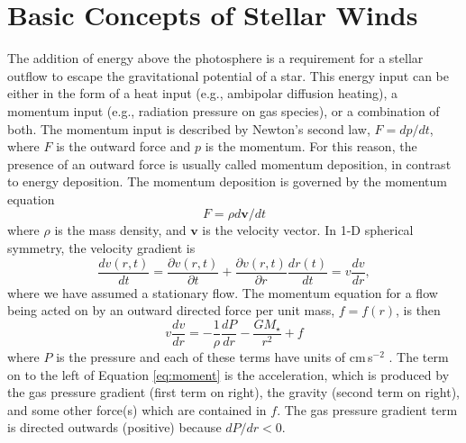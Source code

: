\section{Basic Concepts of Stellar Winds}\label{sec:1.3}
The addition of energy above the photosphere is a requirement for a stellar outflow to escape the gravitational potential of a star. This energy input can be either in the form of a heat input (e.g., ambipolar diffusion heating),  a momentum input (e.g., radiation pressure on gas species), or a combination of both. The momentum input is described by Newton's second law, $F=dp/dt$, where $F$ is the outward force and $p$ is the momentum. For this reason, the presence of an outward force is usually called momentum deposition, in contrast to energy deposition. The momentum deposition is governed by the momentum equation
\begin{equation}
F=\rho d\pmb{v}/dt
\end{equation}
where $\rho$ is the mass density, and $\pmb{v}$ is the velocity vector. In 1-D spherical symmetry, the velocity gradient is
\begin{equation}
\dfrac{dv(r,t)}{dt}=\dfrac{\partial v(r,t)}{\partial t}+\dfrac{\partial v(r,t)}{\partial r}\dfrac{dr(t)}{dt}=v\frac{dv}{dr},
\end{equation}
where we have assumed a stationary flow. The momentum equation for a flow being acted on by an outward directed force per unit mass, $f=f(r)$, is then
\begin{equation}\label{eq:moment}
v\frac{dv}{dr}=-\frac{1}{\rho}\frac{dP}{dr}-\frac{GM_{\star}}{r^2}+f
\end{equation}
where $P$ is the pressure and each of these terms have units of cm\,s$^{-2}$ \citep[e.g.,][]{lamers_1999}. The term on to the left of Equation \ref{eq:moment} is the acceleration, which is produced by the gas pressure gradient (first term on right), the gravity (second term on right), and some other force(s) which are contained in $f$. The gas pressure gradient term is directed outwards (positive) because $dP/dr < 0$. 

